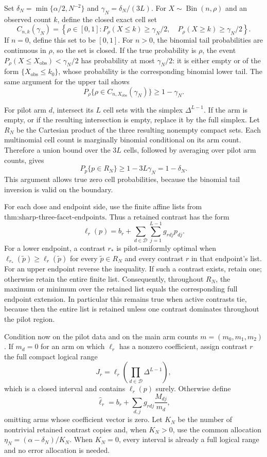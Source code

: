 Set \(\delta_N=\min\{\alpha/2,N^{-2}\}\) and \(\gamma_N=\delta_N/(3L)\).  For \(X\sim\operatorname{Bin}(n,\rho)\) and an observed count \(k\), define the closed exact cell set
\[
 C_{n,k}(\gamma_N)=
 \left\{\rho\in[0,1]:
 P_\rho(X\le k)\ge\gamma_N/2,\quad
 P_\rho(X\ge k)\ge\gamma_N/2\right\}.
\]
If \(n=0\), define this set to be \([0,1]\).  For \(n>0\), the binomial tail probabilities are continuous in \(\rho\), so the set is closed.  If the true probability is \(\rho\), the event \(P_\rho(X\le X_{\mathrm{obs}})<\gamma_N/2\) has probability at most \(\gamma_N/2\): it is either empty or of the form \(\{X_{\mathrm{obs}}\le k_0\}\), whose probability is the corresponding binomial lower tail.  The same argument for the upper tail shows
\[
 P_\rho\{\rho\in C_{n,X_{\mathrm{obs}}}(\gamma_N)\}\ge1-\gamma_N.
\]

For pilot arm \(d\), intersect its \(L\) cell sets with the simplex \(\Delta^{L-1}\).  If the arm is empty, or if the resulting intersection is empty, replace it by the full simplex.  Let \(R_N\) be the Cartesian product of the three resulting nonempty compact sets.  Each multinomial cell count is marginally binomial conditional on its arm count.  Therefore a union bound over the \(3L\) cells, followed by averaging over pilot arm counts, gives
\[
 P_p\{p\in R_N\}\ge1-3L\gamma_N=1-\delta_N.
\]
This argument allows true zero cell probabilities, because the binomial tail inversion is valid on the boundary.

For each dose and endpoint side, use the finite affine lists from \(\text{thm:sharp-three-facet-endpoints}\).  Thus a retained contrast has the form
\[
 \ell_r(p)=b_r+\sum_{d\in\mathcal D}\sum_{j=1}^{L-1}g_{rdj}p_{dj}.
\]
For a lower endpoint, a contrast \(r_*\) is pilot-uniformly optimal when \(\ell_{r_*}(\widetilde p)\ge\ell_r(\widetilde p)\) for every \(\widetilde p\in R_N\) and every contrast \(r\) in that endpoint's list.  For an upper endpoint reverse the inequality.  If such a contrast exists, retain one; otherwise retain the entire finite list.  Consequently, throughout \(R_N\), the maximum or minimum over the retained list equals the corresponding full endpoint extension.  In particular this remains true when active contrasts tie, because then the entire list is retained unless one contrast dominates throughout the pilot region.

Condition now on the pilot data and on the main arm counts \(m=(m_0,m_1,m_2)\).  If \(m_d=0\) for an arm on which \(\ell_r\) has a nonzero coefficient, assign contrast \(r\) the full compact logical range
\[
 J_r=\ell_r\left(\prod_{d\in\mathcal D}\Delta^{L-1}\right),
\]
which is a closed interval and contains \(\ell_r(p)\) surely.  Otherwise define
\[
 \widehat\ell_r=b_r+\sum_{d,j}g_{rdj}\frac{M_{dj}}{m_d},
\]
omitting arms whose coefficient vector is zero.  Let \(K_N\) be the number of nontrivial retained contrast copies and, when \(K_N>0\), use the common allocation \(\eta_N=(\alpha-\delta_N)/K_N\).  When \(K_N=0\), every interval is already a full logical range and no error allocation is needed.

